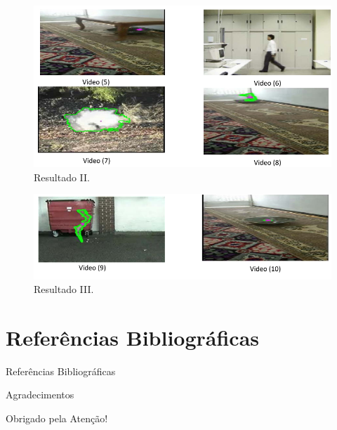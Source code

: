 \documentclass{beamer}
\begin{document}
\begin{frame}{}
	\begin{figure}[H]
		\centering
		\begin{center}
		\includegraphics[width=.95\textwidth]{img/resultado2-artigo9.png}
		\caption{Resultado II.}
		\label{fig:sar}
		\end{center}
	\end{figure}
\end{frame}

\begin{frame}{}
	\begin{figure}[H]
		\centering
		\begin{center}
		\includegraphics[width=\textwidth]{img/resultado3-artigo9.png}
		\caption{Resultado III.}
		\label{fig:sar}
		\end{center}
	\end{figure}
\end{frame}


\section{Referências Bibliográficas}
\begin{frame}[allowframebreaks]{Referências Bibliográficas}
	
\end{frame}


\begin{frame}{Agradecimentos}
		\begin{center}
			{\Huge Obrigado pela Atenção!}
		\end{center}
\end{frame}
\end{document}

